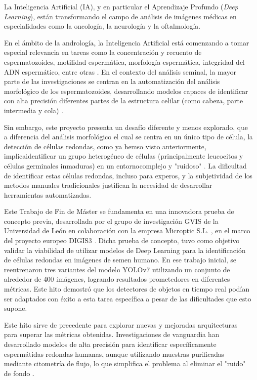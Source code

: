 \documentclass[12pt,a4paper,onecolumn,oneside]{report}
\begin{document}
La Inteligencia Artificial (IA), y en particular el Aprendizaje Profundo (\textit{Deep Learning}), están transformando el campo de análisis de imágenes médicas en especialidades como la oncología, la neurología y la oftalmología.

En el ámbito de la andrología, la Inteligencia Artificial está comenzando a tomar especial relevancia en tareas como la concentración y recuento de espermatozoides, motilidad espermática, morfología espermática, integridad del ADN espermático, entre otras \cite{PannerSelvam}. En el contexto del análisis seminal, la mayor parte de las investigaciones se centran
en la automatización del análisis morfológico de los espermatozoides, desarrollando modelos capaces de identificar con alta precisión diferentes partes de la estructura celilar (como cabeza, parte intermedia y cola) \cite{Maalej2025}.

Sin embargo, este proyecto presenta un desafío diferente y menos explorado, que a diferencia del análisis morfológico el cual se centra en un único tipo de célula,
la detección de células redondas, como ya hemso visto anteriormente, implicaidentificar un grupo heterogéneo de células (principalmente leucocitos y células germinales inmaduras) en un entornocomplejo y "ruidoso" \cite{OMS}\cite{BJBS}.
La dificultad de identificar estas células redondas, incluso para experos, y la subjetividad de los metodos manuales tradicionales \cite{Johanisson2000} justifican la necesidad de desarrollar herramientas automatizadas.

Este Trabajo de Fin de Máster se fundamenta en una innovadora prueba de concepto previa, desarrollada por el grupo de investigación GVIS de la Universidad de León en colaboración con la empresa Microptic S.L. \cite{microptic}, en el marco del proyecto europeo DIGIS3 \cite{digis3}. 
Dicha prueba de concepto, tuvo como objetivo validar la viabilidad de utilizar modelos de Deep Learning para la identificación de células redondas en imágenes de semen humano. En ese trabajo inicial, se reentrenaron tres variantes del modelo YOLOv7 utilizando un conjunto de 
alrededor de 400 imágenes, logrando resultados prometedores en diferentes métricas. Este hito demostró que los detectores de objetos en tiempo real podían ser adaptados con éxito a esta tarea específica a pesar de las dificultades que esto supone.

Este hito sirve de precedente para explorar nuevas y mejoradas arquitecturas para superar las métricas obtenidas. Investigaciones de vanguardia han desarrollado modelos de alta precisión para identificar específicamente espermátidas redondas humanas, 
aunque utilizando muestras purificadas mediante citometría de flujo, lo que simplifica el problema al eliminar el "ruido" de fondo \cite{roundsCellsSpermatid}.
\end{document}
